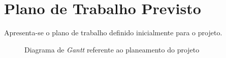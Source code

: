 \chapter{Plano de Trabalho Previsto}
\label{AppendixA}
Apresenta-se o plano de trabalho definido inicialmente para o projeto.

\begin{figure}[!ht]
    \centering
    \caption{Diagrama de \textit{Gantt} referente ao planeamento do projeto}
\end{figure}
